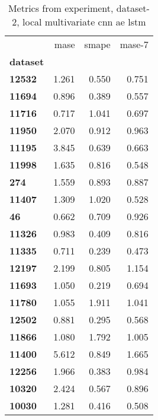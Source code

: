 \begin{table}[h]
\centering
\caption{Metrics from experiment, dataset-2, local multivariate cnn ae lstm}
\label{table:local-multivariate-cnn-ae-lstm-dataset-2}
\begin{tabular}{lrrr}
\toprule
{} &   mase &  smape &  mase-7 \\
\textbf{dataset} &        &        &         \\
\midrule
\textbf{12532  } &  1.261 &  0.550 &   0.751 \\
\textbf{11694  } &  0.896 &  0.389 &   0.557 \\
\textbf{11716  } &  0.717 &  1.041 &   0.697 \\
\textbf{11950  } &  2.070 &  0.912 &   0.963 \\
\textbf{11195  } &  3.845 &  0.639 &   0.663 \\
\textbf{11998  } &  1.635 &  0.816 &   0.548 \\
\textbf{274    } &  1.559 &  0.893 &   0.887 \\
\textbf{11407  } &  1.309 &  1.020 &   0.528 \\
\textbf{46     } &  0.662 &  0.709 &   0.926 \\
\textbf{11326  } &  0.983 &  0.409 &   0.816 \\
\textbf{11335  } &  0.711 &  0.239 &   0.473 \\
\textbf{12197  } &  2.199 &  0.805 &   1.154 \\
\textbf{11693  } &  1.050 &  0.219 &   0.694 \\
\textbf{11780  } &  1.055 &  1.911 &   1.041 \\
\textbf{12502  } &  0.881 &  0.295 &   0.568 \\
\textbf{11866  } &  1.080 &  1.792 &   1.005 \\
\textbf{11400  } &  5.612 &  0.849 &   1.665 \\
\textbf{12256  } &  1.966 &  0.383 &   0.984 \\
\textbf{10320  } &  2.424 &  0.567 &   0.896 \\
\textbf{10030  } &  1.281 &  0.416 &   0.508 \\
\bottomrule
\end{tabular}
\end{table}
